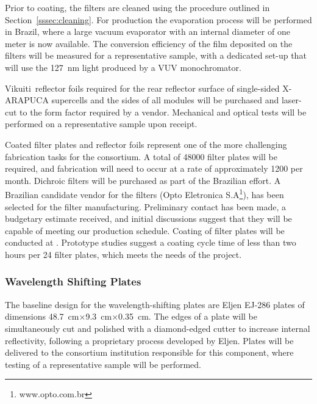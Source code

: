 Prior to coating, the filters are cleaned using the procedure outlined in Section~\ref{sssec:cleaning}.
For  production the evaporation process will be performed
in Brazil, 
where a large vacuum evaporator with an internal diameter of one meter is now available. The conversion efficiency of the film deposited on the filters will be measured for a representative sample, with a dedicated set-up that will use the \SI{127}{nm} light produced by a VUV monochromator.

Vikuiti\texttrademark\ reflector foils required for the rear reflector surface of single-sided X-ARAPUCA supercells and the sides of all modules will be purchased and laser-cut to the form factor required by a vendor.  Mechanical and optical  tests will be performed on a representative sample upon receipt.


Coated filter plates and reflector foils represent one of the more challenging fabrication tasks for the consortium.  A total of \num{48000} filter plates will be required, and fabrication will need to occur at a rate of approximately \num{1200} per month.  Dichroic filters will be purchased as part of the Brazilian effort.  A Brazilian candidate vendor for the filters (Opto Eletronica S.A\footnote{www.opto.com.br}), has been selected for the filter manufacturing.  Preliminary contact has been made, a budgetary estimate received, and initial discussions suggest that they will be capable of meeting our production schedule.  Coating of filter plates will be conducted at .  Prototype studies suggest a coating cycle time of less than two hours per \num{24} filter plates, which meets the needs of the project.

\subsubsection{Wavelength Shifting Plates}

The baseline design for the wavelength-shifting plates are Eljen EJ-286 plates of dimensions \SI{48.7}{cm}$\times$\SI{9.3}{cm}$\times$\SI{0.35}{cm}.  The edges of a plate will be simultaneously cut and polished with a diamond-edged cutter to increase internal reflectivity, following a proprietary process developed by Eljen.  Plates will be delivered to the consortium institution responsible for this component, where  testing of a representative sample will be performed.

